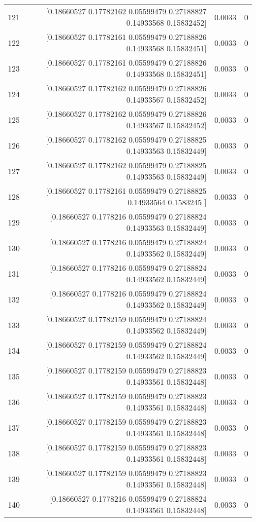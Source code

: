 \begin{longtable}{lrrr}
121 & [0.18660527 0.17782162 0.05599479 0.27188827 0.14933568 0.15832452] & 0.0033 & 0 \\
122 & [0.18660527 0.17782161 0.05599479 0.27188826 0.14933568 0.15832451] & 0.0033 & 0 \\
123 & [0.18660527 0.17782161 0.05599479 0.27188826 0.14933568 0.15832451] & 0.0033 & 0 \\
124 & [0.18660527 0.17782162 0.05599479 0.27188826 0.14933567 0.15832452] & 0.0033 & 0 \\
125 & [0.18660527 0.17782162 0.05599479 0.27188826 0.14933567 0.15832452] & 0.0033 & 0 \\
126 & [0.18660527 0.17782162 0.05599479 0.27188825 0.14933563 0.15832449] & 0.0033 & 0 \\
127 & [0.18660527 0.17782162 0.05599479 0.27188825 0.14933563 0.15832449] & 0.0033 & 0 \\
128 & [0.18660527 0.17782161 0.05599479 0.27188825 0.14933564 0.1583245 ] & 0.0033 & 0 \\
129 & [0.18660527 0.1778216  0.05599479 0.27188824 0.14933563 0.15832449] & 0.0033 & 0 \\
130 & [0.18660527 0.1778216  0.05599479 0.27188824 0.14933562 0.15832449] & 0.0033 & 0 \\
131 & [0.18660527 0.1778216  0.05599479 0.27188824 0.14933562 0.15832449] & 0.0033 & 0 \\
132 & [0.18660527 0.1778216  0.05599479 0.27188824 0.14933562 0.15832449] & 0.0033 & 0 \\
133 & [0.18660527 0.17782159 0.05599479 0.27188824 0.14933562 0.15832449] & 0.0033 & 0 \\
134 & [0.18660527 0.17782159 0.05599479 0.27188824 0.14933562 0.15832449] & 0.0033 & 0 \\
135 & [0.18660527 0.17782159 0.05599479 0.27188823 0.14933561 0.15832448] & 0.0033 & 0 \\
136 & [0.18660527 0.17782159 0.05599479 0.27188823 0.14933561 0.15832448] & 0.0033 & 0 \\
137 & [0.18660527 0.17782159 0.05599479 0.27188823 0.14933561 0.15832448] & 0.0033 & 0 \\
138 & [0.18660527 0.17782159 0.05599479 0.27188823 0.14933561 0.15832448] & 0.0033 & 0 \\
139 & [0.18660527 0.17782159 0.05599479 0.27188823 0.14933561 0.15832448] & 0.0033 & 0 \\
140 & [0.18660527 0.1778216  0.05599479 0.27188824 0.14933561 0.15832448] & 0.0033 & 0 \\

\end{longtable}
